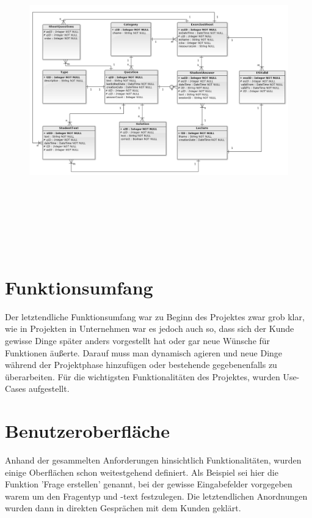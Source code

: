 \begin{landscape}
\begin{figure}
\includegraphics[height=37em]{images/Entityrelationshipdiagram.png}
\end{figure}
\end{landscape}

\section{Funktionsumfang}
Der letztendliche Funktionsumfang war zu Beginn des Projektes zwar grob klar, wie in Projekten in Unternehmen war es jedoch auch so, dass sich der Kunde gewisse Dinge später anders vorgestellt hat oder gar neue Wünsche für Funktionen äußerte.
Darauf muss man dynamisch agieren und neue Dinge während der Projektphase hinzufügen oder bestehende gegebenenfalls zu überarbeiten.
Für die wichtigsten Funktionalitäten des Projektes, wurden Use-Cases aufgestellt.

\section{Benutzeroberfläche}
Anhand der gesammelten Anforderungen hinsichtlich Funktionalitäten, wurden einige Oberflächen schon weitestgehend definiert. 
Als Beispiel sei hier die Funktion 'Frage erstellen' genannt, bei der gewisse Eingabefelder vorgegeben warem um den Fragentyp und -text festzulegen.
Die letztendlichen Anordnungen wurden dann in direkten Gesprächen mit dem Kunden geklärt.